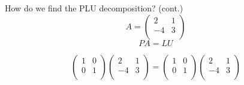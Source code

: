 \documentclass{beamer}
\begin{document}
\begin{frame}{How do we find the PLU decomposition? (cont.)}
\[A=
\begin{pmatrix}{}
                2 & 1 \\
                -4 & 3 \\
            \end{pmatrix}
            \]
            \[
            PA=LU
            \]
            
            \[
  \begin{pmatrix}{}
                1 & 0 \\
                0 & 1 \\
            \end{pmatrix}\begin{pmatrix}{}
            2 & 1 \\
                -4 & 3 \\
        \end{pmatrix}
        =\begin{pmatrix}{}
            1 & 0 \\
                0 & 1 \\
        \end{pmatrix}
        \begin{pmatrix}{}
            2 & 1 \\
                -4 & 3 \\
        \end{pmatrix}
    \]


\end{frame}
\end{document}
